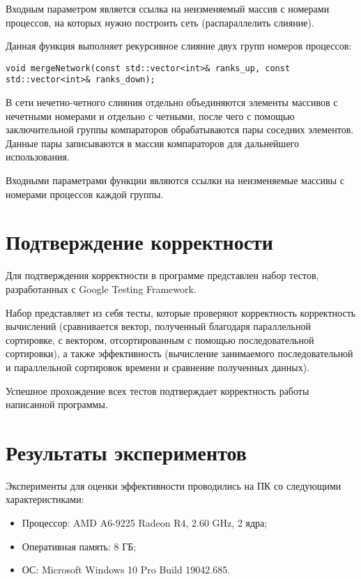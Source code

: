 \documentclass{report}
\begin{document}
\par Входным параметром является ссылка на неизменяемый массив с номерами процессов, на которых нужно построить сеть (распараллелить слияние).
\par Данная функция выполняет рекурсивное слияние двух групп номеров процессов:
\begin{lstlisting}
void mergeNetwork(const std::vector<int>& ranks_up, const std::vector<int>& ranks_down);
\end{lstlisting}
\par В сети нечетно-четного слияния отдельно объединяются элементы массивов с нечетными номерами и отдельно с четными, после чего с помощью заключительной группы компараторов обрабатываются пары соседних элементов. Данные пары записываются в массив компараторов для дальнейшего использования.
\par Входными параметрами функции являются ссылки на неизменяемые массивы с номерами процессов каждой группы.
\newpage

\section*{Подтверждение корректности}
Для подтверждения корректности в программе представлен набор тестов, разработанных с Google Testing Framework.
\par Набор представляет из себя тесты, которые проверяют корректность корректность вычислений (сравнивается вектор, полученный благодаря параллельной сортировке, с вектором, отсортированным с помощью последовательной сортировки), а также эффективность (вычисление занимаемого последовательной и параллельной сортировок времени и сравнение полученных данных).
\par Успешное прохождение всех тестов подтверждает корректность работы написанной программы.
\newpage

\section*{Результаты экспериментов}
Эксперименты для оценки эффективности проводились на ПК со следующими характеристиками:

\begin{itemize}
\item Процессор: AMD A6-9225 Radeon R4, 2.60 GHz, 2 ядра;
\item Оперативная память: 8 ГБ;
\item ОС: Microsoft Windows 10 Pro Build 19042.685.
\end{itemize}
\end{document}
